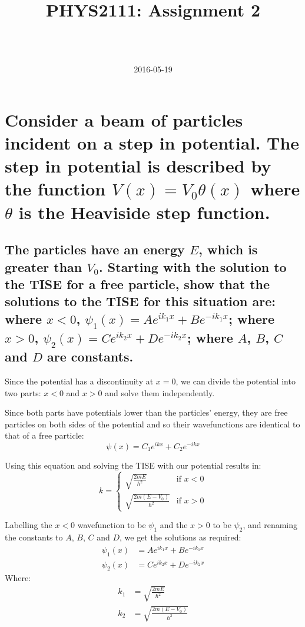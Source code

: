 \documentclass[a4paper]{scrartcl}
\begin{document}
\title{PHYS2111: Assignment 2}
\author{ \\ \\ }
\date{2016-05-19}
\maketitle

\section{Consider a beam of particles incident on a step in potential. The step in potential is described by the function \(V(x) = V_0 \theta(x)\) where \(\theta\) is the Heaviside step function.}
\subsection{The particles have an energy \(E\), which is greater than \(V_0\). Starting with the solution to the TISE for a free particle, show that the solutions to the TISE for this situation are: where \(x < 0\), \(\psi_1(x) = A e^{i k_1 x} + B e^{-i k_1 x}\); where \(x > 0\), \(\psi_2(x) = C e^{i k_2 x} + D e^{-i k_2 x}\); where \(A\), \(B\), \(C\) and \(D\) are constants.}
Since the potential has a discontinuity at \(x = 0\), we can divide the potential into two parts: \(x < 0\) and \(x > 0\) and solve them independently.

Since both parts have potentials lower than the particles' energy, they are free particles on both sides of the potential and so their wavefunctions are identical to that of a free particle:
\[\psi(x) = C_1 e^{i k x} + C_2 e^{-i k x}\]

Using this equation and solving the TISE with our potential results in:
\[
    k =
    \begin{cases}
        \sqrt{\frac{2 m E}{\hbar^2}} & \text{if } x < 0 \\
        \sqrt{\frac{2 m (E - V_0)}{\hbar^2}} & \text{if } x > 0
    \end{cases}
\]

Labelling the \(x < 0\) wavefunction to be \(\psi_1\) and the \(x > 0\) to be \(\psi_2\), and renaming the constants to \(A\), \(B\), \(C\) and \(D\), we get the solutions as required:
\begin{align*}
    \psi_1(x) &= A e^{i k_1 x} + B e^{-i k_1 x} \\
    \psi_2(x) &= C e^{i k_2 x} + D e^{-i k_2 x}
\end{align*}
Where:
\begin{align*}
    k_1 &= \sqrt{\frac{2 m E}{\hbar^2}} \\
    k_2 &= \sqrt{\frac{2 m (E - V_0)}{\hbar^2}}
\end{align*}
\end{document}
